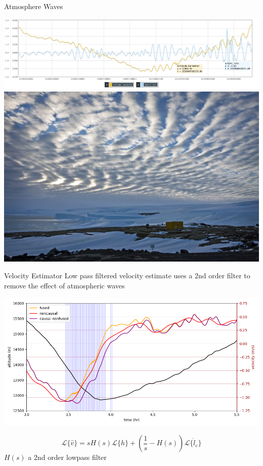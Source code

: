 \documentclass[10pt,mathserif]{beamer}
\begin{document}
\begin{frame}{Atmosphere Waves}
\begin{center}
\includegraphics[width=1\linewidth]{borg.jpg}
\includegraphics[width=.8\linewidth,trim={0 8cm 0 0cm},clip]{waves.jpg}
\end{center}
\end{frame}

\begin{frame}{Velocity Estimator}
Low pass filtered velocity estimate uses a 2nd order filter to remove the effect of atmospheric waves
\begin{center}
\includegraphics[width=.8\linewidth,trim={10 0 10 0cm},clip]{est.png}
\end{center}
\vspace{-0.5cm}
\[ \mathcal{L}\{ \hat v \} = s H(s) \mathcal{L}\{h\} + \left(\frac{1}{s} - H(s) \right) \mathcal{L} \{\dot l_c\} \]
$H(s)$ a 2nd order lowpass filter\\
\end{frame}
\end{document}
